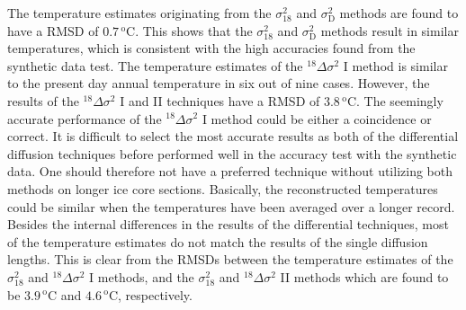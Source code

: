 \documentclass[11pt, draftcls, onecolumn]{IEEEtran} %
\numberwithin{equation}{section}
\numberwithin{table}{section}
\numberwithin{figure}{section}
\begin{document}
The temperature estimates originating from the $\sigma^2_{18}$ and $\sigma^2_{\mathrm{D}}$ methods are found to have a RMSD of $0.7\,^\mathrm{o}\mathrm{C}$. This shows that the $\sigma^2_{18}$ and $\sigma^2_{\mathrm{D}}$ methods result in similar temperatures, which is consistent with the high accuracies found from the synthetic data test.
The temperature estimates of the ${}^{18}\Delta\sigma^2$ I method is similar to the present day annual temperature in six out of nine cases. 
However, the results of the ${}^{18}\Delta\sigma^2$ I and II techniques have a RMSD of $3.8\,^\mathrm{o}\mathrm{C}$.
The seemingly accurate performance of the ${}^{18}\Delta\sigma^2$ I method could be either a coincidence or correct. 
It is difficult to select the most accurate results as both of the differential diffusion techniques
before performed well in the accuracy test with the synthetic data.
One should therefore not have a preferred technique without utilizing both methods on longer ice core sections.
Basically, the reconstructed temperatures could be similar when the temperatures have been averaged over a longer record.
Besides the internal differences in the results of the differential techniques, most of the temperature estimates do not 
match the results of the single diffusion lengths.
This is clear from the RMSDs between the temperature estimates of the $\sigma^2_{18}$ and ${}^{18}\Delta\sigma^2$ I methods, 
and the $\sigma^2_{18}$ and ${}^{18}\Delta\sigma^2$ II methods which are found to be  
$3.9\,^\mathrm{o}\mathrm{C}$ and $4.6\,^\mathrm{o}\mathrm{C}$, respectively.

\end{document}
